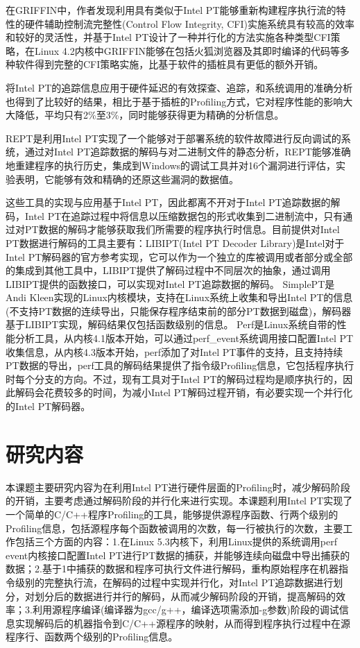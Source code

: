 在GRIFFIN中，作者发现利用具有类似于Intel PT能够重新构建程序执行流的特性的硬件辅助控制流完整性(Control Flow Integrity, CFI)实施系统具有较高的效率和较好的灵活性，并基于Intel PT设计了一种并行化的方法实施各种类型CFI策略，在Linux 4.2内核中GRIFFIN能够在包括火狐浏览器及其即时编译的代码等多种软件得到完整的CFI策略实施，比基于软件的插桩具有更低的额外开销。

将Intel PT的追踪信息应用于硬件延迟的有效探查、追踪，和系统调用的准确分析也得到了比较好的结果，相比于基于插桩的Profiling方式，它对程序性能的影响大大降低，平均只有2\%至3\%，同时能够获得更为精确的分析信息。

REPT是利用Intel PT实现了一个能够对于部署系统的软件故障进行反向调试的系统，通过对Intel PT追踪数据的解码与对二进制文件的静态分析，REPT能够准确地重建程序的执行历史，集成到Windows的调试工具并对16个漏洞进行评估，实验表明，它能够有效和精确的还原这些漏洞的数据值。

这些工具的实现与应用基于Intel PT，因此都离不开对于Intel PT追踪数据的解码，Intel PT在追踪过程中将信息以压缩数据包的形式收集到二进制流中，只有通过对PT数据的解码才能够获取我们所需要的程序执行时信息。目前提供对Intel PT数据进行解码的工具主要有：LIBIPT(Intel PT Decoder Library)是Intel对于Intel PT解码器的官方参考实现，它可以作为一个独立的库被调用或者部分或全部的集成到其他工具中，LIBIPT提供了解码过程中不同层次的抽象，通过调用LIBIPT提供的函数接口，可以实现对Intel PT追踪数据的解码。  SimplePT是Andi Kleen实现的Linux内核模块，支持在Linux系统上收集和导出Intel PT的信息(不支持PT数据的连续导出，只能保存程序结束前的部分PT数据到磁盘)，解码器基于LIBIPT实现，解码结果仅包括函数级别的信息。 Perf是Linux系统自带的性能分析工具，从内核4.1版本开始，可以通过perf\_event系统调用接口配置Intel PT收集信息，从内核4.3版本开始，perf添加了对Intel PT事件的支持，且支持持续PT数据的导出，perf工具的解码结果提供了指令级Profiling信息，它包括程序执行时每个分支的方向。不过，现有工具对于Intel PT的解码过程均是顺序执行的，因此解码会花费较多的时间，为减小Intel PT解码过程开销，有必要实现一个并行化的Intel PT解码器。

\section{研究内容}
本课题主要研究内容为在利用Intel PT进行硬件层面的Profiling时，减少解码阶段的开销，主要考虑通过解码阶段的并行化来进行实现。本课题利用Intel PT实现了一个简单的C/C++程序Profiling的工具，能够提供源程序函数、行两个级别的Profiling信息，包括源程序每个函数被调用的次数，每一行被执行的次数，主要工作包括三个方面的内容：1.在Linux 5.3内核下，利用Linux提供的系统调用perf event内核接口配置Intel PT进行PT数据的捕获，并能够连续向磁盘中导出捕获的数据；2.基于1中捕获的数据和程序可执行文件进行解码，重构原始程序在机器指令级别的完整执行流，在解码的过程中实现并行化，对Intel PT追踪数据进行划分，对划分后的数据进行并行的解码，从而减少解码阶段的开销，提高解码的效率；3.利用源程序编译(编译器为gcc/g++，编译选项需添加-g参数)阶段的调试信息实现解码后的机器指令到C/C++源程序的映射，从而得到程序执行过程中在源程序行、函数两个级别的Profiling信息。


